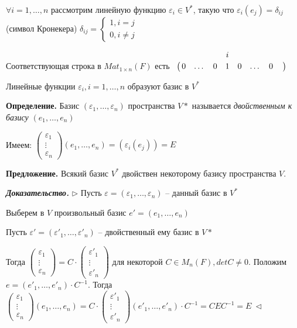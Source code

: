 $\forall i = 1, \dots, n$ рассмотрим линейную функцию $\varepsilon_i \in V^*$, такую что $\varepsilon_i(e_j) = \delta_{ij}$ (символ Кронекера) $\delta_{ij} = \begin{cases}
		1, i=j \\
		0, i \neq j
	\end{cases}$

\bigskip
Соответствующая строка в $Mat_{1 \times n}(F)$ есть $
\bordermatrix{ 
& & & & i & & & &  \cr 
& 0 & \dots & 0 & 1 & 0 & \dots & 0} $

\bigskip
Линейные функции $\varepsilon_i, i = 1, \dots, n$ образуют базис в $V^*$

\bigskip
\textbf{Определение.} Базис $(\varepsilon_1, \dots, \varepsilon_n)$ пространства $V*$ называется \textit{двойственным к базису} $(e_1, \dots, e_n)$

Имеем: $\begin{pmatrix} \varepsilon_1 \\ \vdots \\ \varepsilon_n \end{pmatrix} (e_1, \dots, e_n) = (\varepsilon_i(e_j)) = E$

\bigskip
\textbf{Предложение.} Всякий базис $V^*$ двойствен некоторому базису пространства $V$.

\bigskip
\textbf{\textit{Доказательство.}} $\rhd$ Пусть $\varepsilon = (\varepsilon_1, \dots, \varepsilon_n)$ -- данный базис в $V^*$

Выберем в $V$ произвольный базис $e' = (e_1, \dots, e_n)$

Пусть $\varepsilon' = (\varepsilon'_1, \dots, \varepsilon'_n)$ -- двойственный ему базис в $V*$

\bigskip
Тогда $\begin{pmatrix} \varepsilon_1 \\ \vdots \\ \varepsilon_n \end{pmatrix} = C \cdot \begin{pmatrix} \varepsilon'_1 \\ \vdots \\ \varepsilon'_n \end{pmatrix}$ для некоторой $C \in M_n(F), detC \neq 0$. Положим $e = (e'_1, \dots, e'_n) \cdot C^{-1}$. Тогда $\begin{pmatrix} \varepsilon_1 \\ \vdots \\ \varepsilon_n \end{pmatrix} (e_1, \dots, e_n) = C \cdot \begin{pmatrix} \varepsilon'_1 \\ \vdots \\ \varepsilon'_n \end{pmatrix} (e'_1, \dots, e'_n) \cdot C^{-1} = CEC^{-1} = E \ \lhd$

